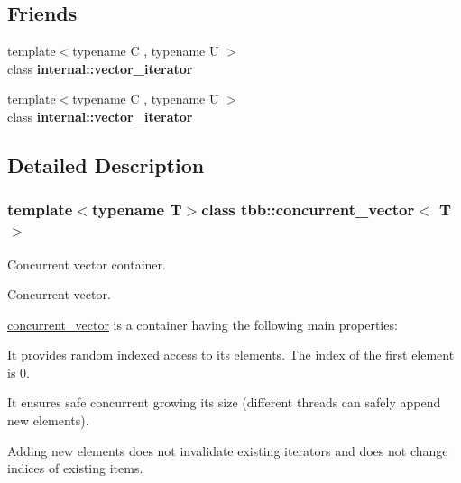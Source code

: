 \subsection*{Friends}
\begin{DoxyCompactItemize}
\item 
\hypertarget{classtbb_1_1concurrent__vector_a134b00c8dd9200b9e45fe81919c66b11}{}{\footnotesize template$<$typename C , typename U $>$ }\\class {\bfseries internal\+::vector\+\_\+iterator}\label{classtbb_1_1concurrent__vector_a134b00c8dd9200b9e45fe81919c66b11}

\item 
\hypertarget{classtbb_1_1concurrent__vector_ae53cf11dd10c5b9b0ffcc0572a3ea22b}{}{\footnotesize template$<$typename C , typename U $>$ }\\class {\bfseries internal\+::vector\+\_\+iterator}\label{classtbb_1_1concurrent__vector_ae53cf11dd10c5b9b0ffcc0572a3ea22b}

\end{DoxyCompactItemize}


\subsection{Detailed Description}
\subsubsection*{template$<$typename T$>$class tbb\+::concurrent\+\_\+vector$<$ T $>$}

Concurrent vector container. 

Concurrent vector.

\hyperlink{classtbb_1_1concurrent__vector}{concurrent\+\_\+vector} is a container having the following main properties\+:
\begin{DoxyItemize}
\item It provides random indexed access to its elements. The index of the first element is 0.
\item It ensures safe concurrent growing its size (different threads can safely append new elements).
\item Adding new elements does not invalidate existing iterators and does not change indices of existing items.
\end{DoxyItemize}

